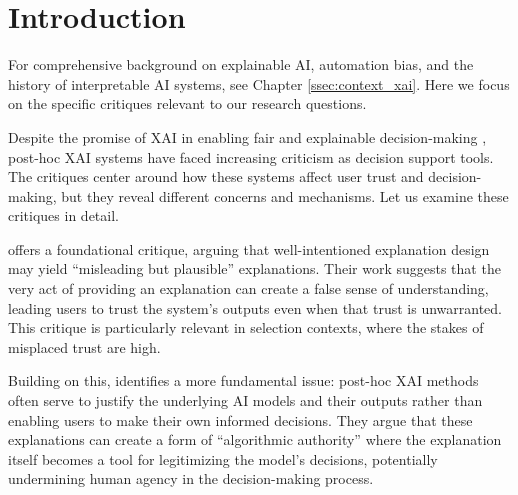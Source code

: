 
\section{Introduction}
For comprehensive background on explainable AI, automation bias, and the history of interpretable AI systems, see Chapter \ref{ssec:context_xai}. Here we focus on the specific critiques relevant to our research questions.

Despite the promise of XAI in enabling fair and explainable decision-making \cite{Goodman_Flaxman_2017}, post-hoc XAI systems have faced increasing criticism as decision support tools. The critiques center around how these systems affect user trust and decision-making, but they reveal different concerns and mechanisms. Let us examine these critiques in detail.

\textcite{Lipton} offers a foundational critique, arguing that well-intentioned explanation design may yield ``misleading but plausible'' explanations. Their work suggests that the very act of providing an explanation can create a false sense of understanding, leading users to trust the system's outputs even when that trust is unwarranted. This critique is particularly relevant in selection contexts, where the stakes of misplaced trust are high.

Building on this, \textcite{miller_explainable_2023} identifies a more fundamental issue: post-hoc XAI methods often serve to justify the underlying AI models and their outputs rather than enabling users to make their own informed decisions. They argue that these explanations can create a form of ``algorithmic authority'' where the explanation itself becomes a tool for legitimizing the model's decisions, potentially undermining human agency in the decision-making process.

